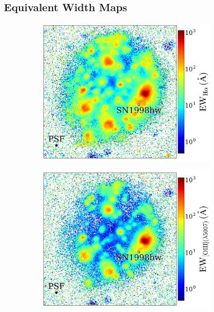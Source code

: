 \documentclass[traditabstract]{aa}
\begin{document}
\subsection{Equivalent Width Maps}
\begin{figure}
\begin{subfigure}{.24\textwidth}
  \includegraphics[width=1.0\linewidth]{Figs/MUSE_SN1998bw_HaEW.pdf}
\end{subfigure}
\begin{subfigure}{.24\textwidth}
  \hspace*{-0.1cm}\includegraphics[width=1.0\linewidth]{Figs/MUSE_SN1998bw_OIIIEW.pdf}

\end{subfigure}
\end{figure}
\end{document}
